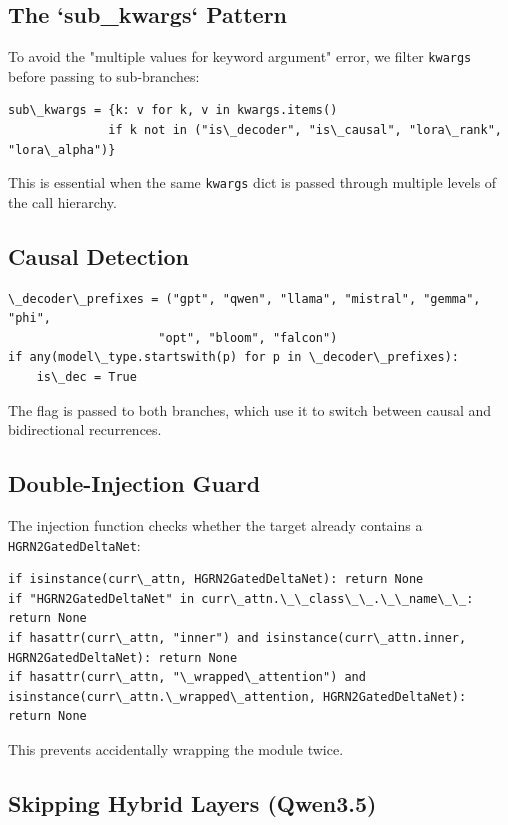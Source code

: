 \subsection{The `sub\_kwargs` Pattern}

To avoid the "multiple values for keyword argument" error, we filter 
\texttt{kwargs} before passing to sub-branches:

\begin{lstlisting}
sub\_kwargs = {k: v for k, v in kwargs.items() 
              if k not in ("is\_decoder", "is\_causal", "lora\_rank", "lora\_alpha")}
\end{lstlisting}

This is essential when the same \texttt{kwargs} dict is passed through multiple 
levels of the call hierarchy.

\subsection{Causal Detection}

\begin{lstlisting}
\_decoder\_prefixes = ("gpt", "qwen", "llama", "mistral", "gemma", "phi", 
                     "opt", "bloom", "falcon")
if any(model\_type.startswith(p) for p in \_decoder\_prefixes):
    is\_dec = True
\end{lstlisting}

The flag is passed to both branches, which use it to switch between 
causal and bidirectional recurrences.

\subsection{Double-Injection Guard}

The injection function checks whether the target already contains a 
\texttt{HGRN2GatedDeltaNet}:

\begin{lstlisting}
if isinstance(curr\_attn, HGRN2GatedDeltaNet): return None
if "HGRN2GatedDeltaNet" in curr\_attn.\_\_class\_\_.\_\_name\_\_: return None
if hasattr(curr\_attn, "inner") and isinstance(curr\_attn.inner, HGRN2GatedDeltaNet): return None
if hasattr(curr\_attn, "\_wrapped\_attention") and isinstance(curr\_attn.\_wrapped\_attention, HGRN2GatedDeltaNet): return None
\end{lstlisting}

This prevents accidentally wrapping the module twice.

\subsection{Skipping Hybrid Layers (Qwen3.5)}

